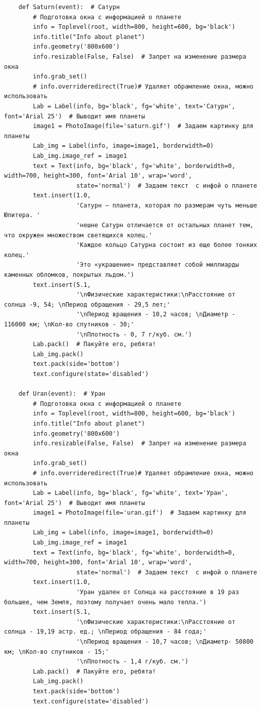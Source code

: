 \documentclass[11pt,a4paper]{report}
\begin{document}
\begin{verbatim}
    def Saturn(event):  # Сатурн
        # Подготовка окна с информацией о планете
        info = Toplevel(root, width=800, height=600, bg='black')
        info.title("Info about planet")
        info.geometry('800x600')
        info.resizable(False, False)  # Запрет на изменение размера окна
        info.grab_set()
        # info.overrideredirect(True)# Удаляет обрамление окна, можно использовать
        Lab = Label(info, bg='black', fg='white', text='Сатурн', font='Arial 25')  # Выводит имя планеты
        image1 = PhotoImage(file='saturn.gif')  # Задаем картинку для планеты
        Lab_img = Label(info, image=image1, borderwidth=0)
        Lab_img.image_ref = image1
        text = Text(info, bg='black', fg='white', borderwidth=0, width=700, height=300, font='Arial 10', wrap='word',
                    state='normal')  # Задаем текст  с инфой о планете
        text.insert(1.0,
                    'Сатурн — планета, которая по размерам чуть меньше Юпитера. '
                    'нешне Сатурн отличается от остальных планет тем, что окружен множеством светящихся колец.'
                    'Каждое кольцо Сатурна состоит из еще более тонких колец.'
                    'Это «украшение» представляет собой миллиарды каменных обломков, покрытых льдом.')
        text.insert(5.1,
                    '\nФизические характеристики:\nРасстояние от солнца -9, 54; \nПериод обращения - 29,5 лет;'
                    '\nПериод вращения - 10,2 часов; \nДиаметр - 116000 км; \nКол-во спутников - 30;'
                    '\nПлотность - 0, 7 г/куб. см.')
        Lab.pack()  # Пакуйте его, ребята!
        Lab_img.pack()
        text.pack(side='bottom')
        text.configure(state='disabled')

    def Uran(event):  # Уран
        # Подготовка окна с информацией о планете
        info = Toplevel(root, width=800, height=600, bg='black')
        info.title("Info about planet")
        info.geometry('800x600')
        info.resizable(False, False)  # Запрет на изменение размера окна
        info.grab_set()
        # info.overrideredirect(True)# Удаляет обрамление окна, можно использовать
        Lab = Label(info, bg='black', fg='white', text='Уран', font='Arial 25')  # Выводит имя планеты
        image1 = PhotoImage(file='uran.gif')  # Задаем картинку для планеты
        Lab_img = Label(info, image=image1, borderwidth=0)
        Lab_img.image_ref = image1
        text = Text(info, bg='black', fg='white', borderwidth=0, width=700, height=300, font='Arial 10', wrap='word',
                    state='normal')  # Задаем текст  с инфой о планете
        text.insert(1.0,
                    'Уран удален от Солнца на расстояние в 19 раз большее, чем Земля, поэтому получает очень мало тепла.')
        text.insert(5.1,
                    '\nФизические характеристики:\nРасстояние от солнца - 19,19 астр. ед.; \nПериод обращения - 84 года;'
                    '\nПериод вращения - 10,7 часов; \nДиаметр- 50800 км; \nКол-во спутников - 15;'
                    '\nПлотность - 1,4 г/куб. см.')
        Lab.pack()  # Пакуйте его, ребята!
        Lab_img.pack()
        text.pack(side='bottom')
        text.configure(state='disabled')


\end{verbatim}
\end{document}
